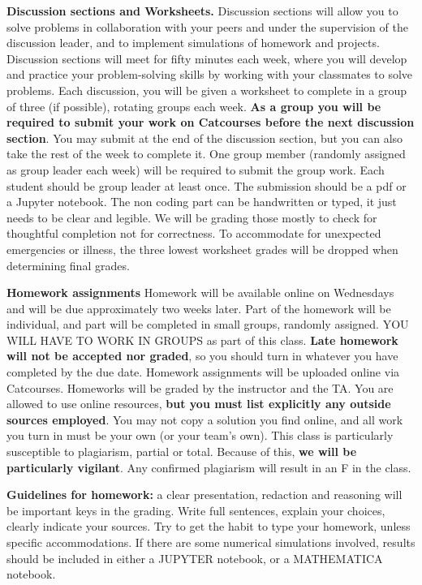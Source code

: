 \documentclass{article}
\newcommand{\secskip}{\vspace{6pt}}
\begin{document}
\textbf{Discussion sections and Worksheets.} Discussion sections will allow you to solve problems in collaboration with your peers and under the supervision of the discussion leader, and to implement simulations of homework and projects. Discussion sections will meet for fifty minutes each week, where you will develop and practice your problem-solving skills by working with your classmates to solve  problems. Each discussion, you will be given a worksheet to complete in a group of three (if possible), rotating groups each week. \textbf{As a group you will be required to submit your work on Catcourses before the next discussion section}. You may submit at the end of the discussion section, but you can also take the rest of the week to complete it. One group member (randomly assigned as group leader each week) will be required to submit the group work. Each student should be group leader at least once. The submission should be a pdf or a Jupyter notebook. The non coding part can be handwritten or typed, it just needs to be clear and legible. We will be grading those mostly to check for thoughtful completion not for correctness. To accommodate for unexpected emergencies or illness, the three lowest worksheet grades will be dropped when determining final grades. 
  



  \secskip

\textbf{Homework assignments} Homework will be available online on Wednesdays and will be due approximately two weeks later. Part of the homework will be individual, and part will be completed in small groups, randomly assigned. YOU WILL HAVE TO WORK IN GROUPS as part of this class.
\textbf{Late homework will not be accepted nor graded}, so you should turn in whatever you have completed by the due date. Homework assignments will be uploaded online via Catcourses. Homeworks will be graded by the instructor and the TA. You are allowed to use online resources, {\bf but you must list explicitly any outside sources employed}. You may not copy a solution you find online, and all work you turn in must be your own (or your team's own). This class is particularly susceptible to plagiarism, partial or total. Because of this, {\bf we will be particularly vigilant}. Any confirmed plagiarism will result in an F in the class.

\textbf{Guidelines for homework:} a clear presentation, redaction and reasoning will be important keys in the grading. Write full sentences, explain your choices, clearly indicate your sources. Try to get the habit to type your homework, unless specific accommodations. If there are some numerical simulations involved, results should be included in either a JUPYTER notebook, or a MATHEMATICA notebook. 
\end{document}
